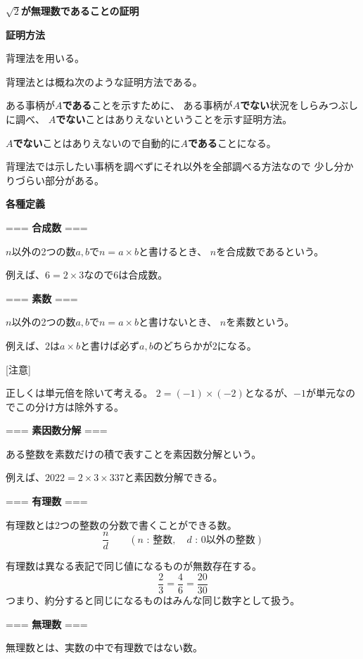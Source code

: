 \documentclass[12pt,b5paper]{ltjsarticle}
\begin{document}
\hrulefill
\textbf{$\sqrt{2}$が無理数であることの証明}
\hrulefill

\dotfill
\textbf{証明方法}
\dotfill

背理法を用いる。

背理法とは概ね次のような証明方法である。

ある事柄が\textbf{$A$である}ことを示すために、
ある事柄が\textbf{$A$でない}状況をしらみつぶしに調べ、
\textbf{$A$でない}ことはありえないということを示す証明方法。

\textbf{$A$でない}ことはありえないので自動的に\textbf{$A$である}ことになる。

背理法では示したい事柄を調べずにそれ以外を全部調べる方法なので
少し分かりづらい部分がある。

\dotfill
\textbf{各種定義}
\dotfill

===
\textbf{合成数}
===

$n$以外の2つの数$a,b$で$n=a\times b$と書けるとき、
$n$を合成数であるという。

例えば、$6=2\times 3$なので$6$は合成数。

===
\textbf{素数}
===

$n$以外の2つの数$a,b$で$n=a\times b$と書けないとき、
$n$を素数という。

例えば、$2$は$a\times b$と書けば必ず$a,b$のどちらかが$2$になる。

{\footnotesize
[注意]

正しくは単元倍を除いて考える。
$2=(-1)\times(-2)$となるが、$-1$が単元なのでこの分け方は除外する。
}

===
\textbf{素因数分解}
===

ある整数を素数だけの積で表すことを素因数分解という。

例えば、$2022 = 2\times 3\times 337$と素因数分解できる。

===
\textbf{有理数}
===

有理数とは2つの整数の分数で書くことができる数。
\begin{equation}
 \frac{n}{d} \qquad (n\text{ : 整数},\quad d\text{ : 0以外の整数})
\end{equation}

有理数は異なる表記で同じ値になるものが無数存在する。
\begin{equation}
 \frac{2}{3}
  =\frac{4}{6}
  =\frac{20}{30}
\end{equation}
つまり、約分すると同じになるものはみんな同じ数字として扱う。

===
\textbf{無理数}
===

無理数とは、実数の中で有理数ではない数。
\end{document}
